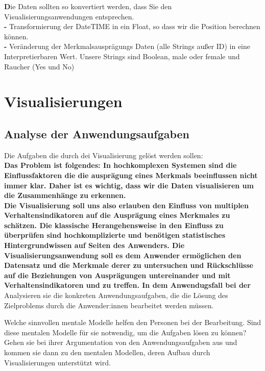 \documentclass[usegeometry=true]{scrartcl}
\begin{document}
\textbf Die Daten sollten so konvertiert werden, dass Sie den Visualisierungsanwendungen entsprechen. \\

\textbf - Transformierung der DateTIME in ein Float, so dass wir die Position berechnen können.\\
\textbf - Veränderung der Merkmalsausprägungs Daten (alle Strings außer ID) in eine Interpretierbaren Wert. Unsere Strings sind Boolean, male oder female und Raucher (Yes und No)\\
   

\section{Visualisierungen}
\subsection{Analyse der Anwendungsaufgaben}
Die Aufgaben die durch dei Visualisierung gelöst werden sollen: \\ 
\textbf{ Das Problem ist folgendes: In hochkomplexen Systemen sind die Einflussfaktoren die die ausprägung eines Merkmals beeinflussen nicht immer klar. Daher ist es wichtig, dass wir die Daten visualisieren um die Zusammenhänge zu erkennen.\\
Die Visualisierung soll uns also erlauben den Einfluss von multiplen Verhaltensindikatoren auf die Ausprägung eines Merkmales zu schätzen. 
Die klassische Herangehensweise in den Einfluss zu überprüfen sind hochkomplizierte und benötigen
statistisches Hintergrundwissen auf Seiten des Anwenders. Die Visualisierungsanwendung soll es dem Anwender ermöglichen den Datensatz und die Merkmale derer zu untersuchen und Rückschlüsse auf die Beziehungen von Ausprägungen untereinander und mit Verhaltensindikatoren und zu treffen.
 In dem Anwendugsfall bei der  \\  }
Analysieren sie die konkreten Anwendungsaufgaben, die die Lösung des Zielproblems durch die Anwender:innen bearbeitet werden müssen. 

Welche sinnvollen mentale Modelle helfen den Personen bei der Bearbeitung. 
Sind diese mentalen Modelle für sie notwendig, um die Aufgaben lösen zu können? 
Gehen sie bei ihrer Argumentation von den Anwendungsaufgaben aus und kommen sie dann zu den mentalen Modellen, deren Aufbau durch Visualisierungen unterstützt wird. 
\end{document}
